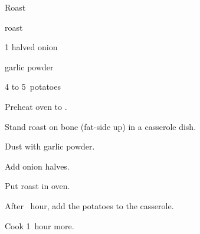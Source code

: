 \begin{recipe}{Roast}{}{}

\begin{ingredients}
\item {} roast
\item 1 halved onion
\item garlic powder
\item 4 to 5~potatoes
\end{ingredients}

\begin{directions}
\item Preheat oven to .
\item Stand roast on bone (fat-side up) in a casserole dish.
\item Dust with garlic powder.
\item Add onion halves.
\item Put roast in oven.
\item After \half~hour, add the potatoes to the casserole.
\item Cook 1~hour more.
\end{directions}
\end{recipe}
